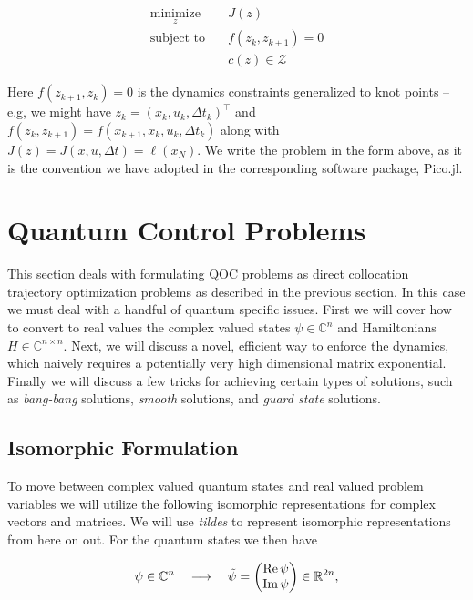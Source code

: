 \documentclass{article}
\newcommand{\isopsi}{\tilde \psi}
\newcommand{\minimize}[1]{\underset{#1}{\text{minimize}}}
\newcommand{\st}{\text{subject to}}
\begin{document}
\begin{align}
  \minimize{z} \quad & J(z) \\
  \st \quad & f(z_k, z_{k+1}) = 0 \\
            & c(z) \in \mathcal{Z} 
\end{align}

Here $f(z_{k+1}, z_k) = 0$ is the dynamics constraints generalized to knot points -- e.g, we might have $z_k = (x_k, u_k, \Delta t_k)^\top$ and $f(z_k, z_{k+1}) = f(x_{k+1}, x_k, u_k, \Delta t_k)$ along with $J(z) = J(x, u, \Delta t) = \ell(x_N)$. We write the problem in the form above, as it is the convention we have adopted in the corresponding software package, Pico.jl. 



\section{Quantum Control Problems}

This section deals with formulating QOC problems as direct collocation trajectory optimization problems as described in the previous section. In this case we must deal with a handful of quantum specific issues.  First we will cover how to convert to real values the complex valued states $\psi \in \mathbb{C}^n$ and Hamiltonians $H \in \mathbb{C}^{n \times n}$.  Next, we will discuss a novel, efficient way to enforce the dynamics, which naively requires a potentially very high dimensional matrix exponential. Finally we will discuss a few tricks for achieving certain types of solutions, such as \textit{bang-bang} solutions, \textit{smooth} solutions, and \textit{guard state} solutions. 



\subsection{Isomorphic Formulation}
To move between complex valued quantum states and real valued problem variables we will utilize the following isomorphic representations for complex vectors and matrices.  We will use \textit{tildes} to represent isomorphic representations from here on out. For the quantum states we then have

\begin{equation}
  \psi \in \mathbb{C}^n \quad \longrightarrow \quad \isopsi = \mqty(\Re \psi \\ \Im \psi) \in \mathbb{R}^{2n},
\end{equation}
\end{document}
